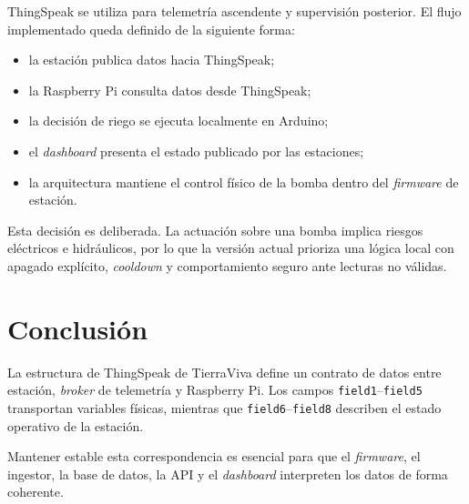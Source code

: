 ThingSpeak se utiliza para telemetría ascendente y supervisión posterior. El flujo implementado queda definido de la siguiente forma:

\begin{itemize}
    \item la estación publica datos hacia ThingSpeak;
    \item la Raspberry Pi consulta datos desde ThingSpeak;
    \item la decisión de riego se ejecuta localmente en Arduino;
    \item el \textit{dashboard} presenta el estado publicado por las estaciones;
    \item la arquitectura mantiene el control físico de la bomba dentro del \textit{firmware} de estación.
\end{itemize}

Esta decisión es deliberada. La actuación sobre una bomba implica riesgos eléctricos e hidráulicos, por lo que la versión actual prioriza una lógica local con apagado explícito, \textit{cooldown} y comportamiento seguro ante lecturas no válidas.

\section{Conclusión}

La estructura de ThingSpeak de TierraViva define un contrato de datos entre estación, \textit{broker} de telemetría y Raspberry Pi. Los campos \texttt{field1}--\texttt{field5} transportan variables físicas, mientras que \texttt{field6}--\texttt{field8} describen el estado operativo de la estación.

Mantener estable esta correspondencia es esencial para que el \textit{firmware}, el ingestor, la base de datos, la API y el \textit{dashboard} interpreten los datos de forma coherente.